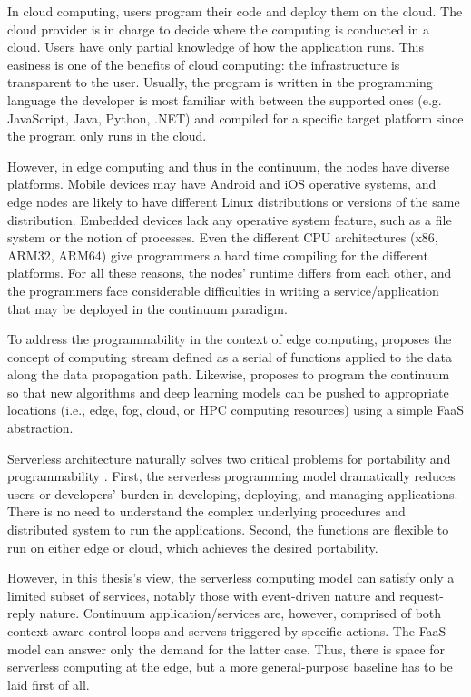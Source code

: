 \documentclass{ieeeaccess}
\begin{document}
In cloud computing, users program their code and deploy them on the cloud. The cloud provider is in charge to decide where the computing is conducted in a cloud. Users have only partial knowledge of how the application runs. This easiness is one of the benefits of cloud computing: the infrastructure is transparent to the user. Usually, the program is written in the programming language the developer is most familiar with between the supported ones (e.g. JavaScript, Java, Python, .NET) and compiled for a specific target platform since the program only runs in the cloud.

However, in edge computing and thus in the continuum, the nodes have diverse platforms. Mobile devices may have Android and iOS operative systems, and edge nodes are likely to have different Linux distributions or versions of the same distribution. Embedded devices lack any operative system feature, such as a file system or the notion of processes. Even the different CPU architectures (x86, ARM32, ARM64) give programmers a hard time compiling for the different platforms. For all these reasons, the nodes' runtime differs from each other, and the programmers face considerable difficulties in writing a service/application that may be deployed in the continuum paradigm.

To address the programmability in the context of edge computing, \cite{edge-computing-vision-challenges} proposes the concept of computing stream defined as a serial of functions applied to the data along the data propagation path. Likewise, \cite{harnessing-continuum} proposes to program the continuum so that new algorithms and deep learning models can be pushed to appropriate locations (i.e., edge, fog, cloud, or HPC computing resources) using a simple FaaS abstraction.

Serverless architecture naturally solves two critical problems for portability and programmability \cite{lavea}. First, the serverless programming model dramatically reduces users or developers' burden in developing, deploying, and managing applications. There is no need to understand the complex underlying procedures and distributed system to run the applications. Second, the functions are flexible to run on either edge or cloud, which achieves the desired portability.

However, in this thesis's view, the serverless computing model can satisfy only a limited subset of services, notably those with event-driven nature and request-reply nature. Continuum application/services are, however, comprised of both context-aware control loops and servers triggered by specific actions. The FaaS model can answer only the demand for the latter case. Thus, there is space for serverless computing at the edge, but a more general-purpose baseline has to be laid first of all.
\end{document}
